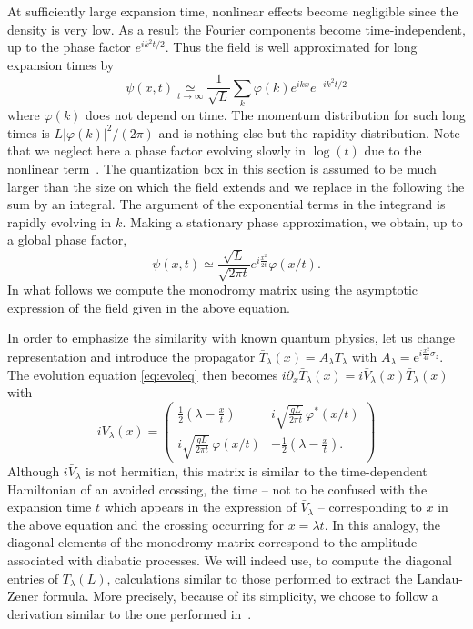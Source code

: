 \documentclass[submission,Phys,10pt]{SciPost}%
\begin{document}
At sufficiently large expansion time, nonlinear effects become negligible since the density is very low. As a result the 
Fourier components become time-independent, up to the phase factor 
$e^{ik^2t/2}$. Thus the field is well approximated for long expansion times by
\begin{equation}
    \psi(x,t)\underset{t\rightarrow\infty}{\simeq} \frac{1}{\sqrt{L}}\sum_k \varphi (k) 
    e^{ikx}e^{-ik^2t/2}
\end{equation}
where $\varphi (k)$ does not depend on time. 
The momentum distribution for such long times is $L|\varphi (k)|^2/(2\pi)$ and is nothing else but the rapidity distribution.
Note that we neglect here a phase factor evolving slowly in $\log(t)$ due to the nonlinear term~\cite{novikov_theory_1984}. The quantization box in this section is assumed to be much larger than the size on which the field extends and we replace in the following the sum by an integral.
The argument of the exponential terms in the integrand is rapidly evolving in $k$. Making a stationary phase approximation, we obtain, up to a global phase factor,
\begin{equation}
    \psi (x,t) \simeq \frac{\sqrt{L}}{\sqrt{ 2\pi t}} e^{ i \frac{x^{2}}{2 t}}  \varphi(x/t).
    \label{eq:fieldfarexp}
\end{equation}
In what follows we compute the monodromy matrix using  the asymptotic expression of the field given in the above equation.

In order to emphasize the similarity  with known quantum physics, let us change representation and introduce the propagator
$\bar{T}_{\lambda}(x) = A_{\lambda} T_{\lambda} $ with $A_{\lambda} = \mathrm{e}^{i \frac{x^2}{4t} \sigma_{z}}$.
The evolution equation \eqref{eq:evoleq} then becomes  
 $i\partial_{x}\bar{T}_{\lambda}(x) = i\bar{V}_{\lambda}(x)  \bar{T}_{\lambda}(x)  $ with
\begin{equation}
    i\bar{V}_{\lambda} (x)  =   \begin{pmatrix} \frac{1}{2} \left( \lambda - \frac{x}{t} \right) & i\sqrt{\frac{gL}{2\pi t}}\, \varphi^*(x/t)  \\ i\sqrt{\frac{gL}{2\pi t}}\,  \varphi(x/t) & -\frac{1}{2} \left( \lambda - \frac{x}{t} \right).
    \end{pmatrix}
\end{equation}
Although $i \bar{V}_\lambda$ is not hermitian, this matrix is similar to the time-dependent Hamiltonian 
of an avoided crossing, the time -- not to be confused with the expansion time $t$ which appears in the expression of $\bar{V}_\lambda$ -- corresponding to $x$ in the above equation and the crossing occurring for $x=\lambda t$. In this analogy, the diagonal elements of the monodromy matrix correspond to the amplitude associated with diabatic processes. We will indeed use,  to compute the diagonal entries of $T_\lambda(L)$, calculations similar to those performed  to extract the Landau-Zener formula.
More precisely, because of its simplicity, we choose to follow a derivation similar to the one performed in~\cite{wittig_landauzener_2005}. 
\end{document}
